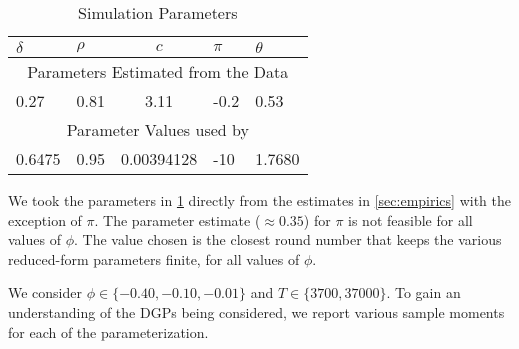 \documentclass[11pt, letterpaper, twoside]{article}
\begin{document}
\begin{table}[htb]
  
  \centering
  \caption{Simulation Parameters}
  \label{tbl:simulationParameters}
  
  \begin{tabularx}{.8\textwidth}{X X c X X}

    \toprule
    $\delta$  & $\rho$  & $c$  & $\pi$ & $\theta$ \\
    \midrule
    \multicolumn{5}{c}{Parameters Estimated from the Data} \\
    \midrule
    0.27    & 0.81   & 3.11 & -0.2 & 0.53 \\
%
    \midrule
    \multicolumn{5}{c}{Parameter Values used by \textcite{han2018leverage}} \\
    \midrule
    0.6475    & 0.95   & \num[scientific-notation=true]{.00394128} & -10 & 1.7680 \\
    \bottomrule
%
  \end{tabularx}

\end{table}

We took the parameters in \cref{tbl:simulationParameters} directly from the estimates in \cref{sec:empirics} with the exception of $\pi$. The parameter estimate ($\approx 0.35$) for $\pi$ is not feasible for all values of $\phi$.
The value chosen is the closest round number that keeps the various reduced-form parameters finite, for all values of $\phi$.

We consider $\phi \in \lbrace -0.40, -0.10, -0.01 \rbrace$ and $T \in \lbrace 3700, 37000 \rbrace$. To gain an understanding of the DGPs being considered, we report various sample moments for each of the parameterization.


  

  
\end{document}
